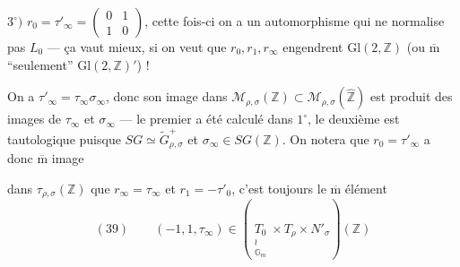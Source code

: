 $3^\circ)$ $r_0=\tau'_\infty=\begin{pmatrix}0&1\\1&0\end{pmatrix}$, cette fois-ci on a un automorphisme  qui ne normalise pas $L_0$ --- ça vaut mieux, si on veut que $r_0,r_1,r_\infty$ engendrent $\mathrm{Gl}(2,\mathbb Z)$ (ou $\overline{\mathrm m}$ ``seulement'' $\mathrm{Gl}(2,\mathbb Z)'$) !

On a $\tau'_\infty=\tau_\infty\sigma_\infty$, donc son image dans $\mathcal M_{\rho,\sigma}(\mathbb Z)\subset\mathcal M_{\rho,\sigma}(\widehat{\mathbb Z})$ est  produit des images de $\tau_\infty$ et $\sigma_\infty$ --- le premier a été calculé dans $1^\circ$, le deuxième est tautologique puisque $SG\simeq\widetilde G_{\rho,\sigma}^{+}$ et $\sigma_\infty\in SG(\mathbb Z)$. On notera que  $r_0=\tau'_\infty$ a donc $\overline{\mathrm m}$ image


dans $\tau_{\rho,\sigma}(\mathbb Z)$ que $r_\infty=\tau_\infty$ et $r_1=-\tau'_0$, c'est toujours le $\overline{\mathrm m}$ élément 
\[
(39)\qquad (-1,1,\tau_\infty)\in
\left(\underset{\substack{\wr\\\mathbb G_m}}{T_0}\times T_\rho\times N'_\sigma\right)(\mathbb Z)
\]

